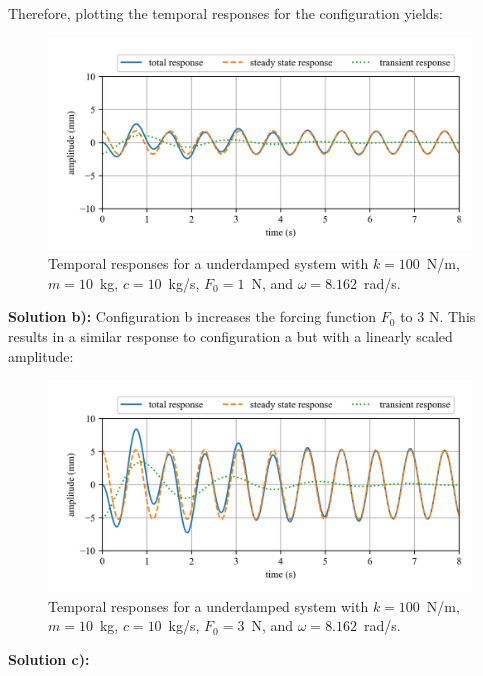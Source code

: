 \documentclass[12pt,letter]{article}
\begin{document}
\begin{example}
		\noindent Therefore, plotting the temporal responses for the configuration yields:
		\begin{figure}[H]
			\centering
			\includegraphics[]{../figures/homogeneous_and_particular_solutions_in_resonance_a.png}
			\caption{Temporal responses for a underdamped system with $k=100$~N/m, $m=10$~kg,  $c=10$~kg/s, $F_0=1$~N, and $\omega = 8.162$~rad/s.}
		\end{figure}			
 
		\noindent\textbf{Solution b):} Configuration b increases the forcing function $F_0$ to 3 N. This results in a similar response to configuration a but with a linearly scaled amplitude:
		\begin{figure}[H]
			\centering
			\includegraphics[]{../figures/homogeneous_and_particular_solutions_in_resonance_b.png}
			\caption{Temporal responses for a underdamped system with $k=100$~N/m, $m=10$~kg,  $c=10$~kg/s, $F_0=3$~N, and $\omega = 8.162$~rad/s.}
		\end{figure}			
		
		\noindent\textbf{Solution c):}


\end{example}
\end{document}
